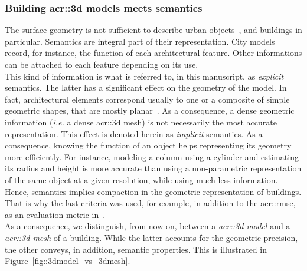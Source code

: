         \subsubsection{Building \texorpdfstring{\gls*{acr::3d}}{3D} models meets semantics}
            \label{subsubsec::introduction::urban_3d_reconstruction::building_3d_modeling::semantics}
            The surface geometry is not sufficient to describe urban objects~\parencite{biljecki2016improved}, and buildings in particular.
            Semantics are integral part of their representation.
            City models record, for instance, the function of each architectural feature.
            Other informations can be attached to each feature depending on its use.\\
            This kind of information is what is referred to, in this manuscript, as \textit{explicit} semantics.
            The latter has a significant effect on the geometry of the model.
            In fact, architectural elements correspond usually to one or a composite of simple geometric shapes, that are mostly planar~\parencite{kolbe2005citygml}.
            As a consequence, a dense geometric information (\textit{i.e.} a dense \gls{acr::3d} mesh) is not necessarily the most accurate representation.
            This effect is denoted herein as \textit{implicit} semantics.
            As a consequence, knowing the function of an object helps representing its geometry more efficiently.
            For instance, modeling a column using a cylinder and estimating its radius and height is more accurate than using a non-parametric representation of the same object at a given resolution, while using much less information.
            Hence, semantics implies compaction in the geometric representation of buildings.
            That is why the last criteria was used, for example, in addition to the \gls{acr::rmse}, as an evaluation metric in~\textcite{lafarge2012creating}.\\
            As a consequence, we distinguish, from now on, between a \textit{\gls{acr::3d} model} and a \textit{\gls{acr::3d} mesh} of a building.
            While the latter accounts for the geometric precision, the other conveys, in addition, semantic properties.
            This is illustrated in Figure~\ref{fig::3dmodel_vs_3dmesh}.\\

